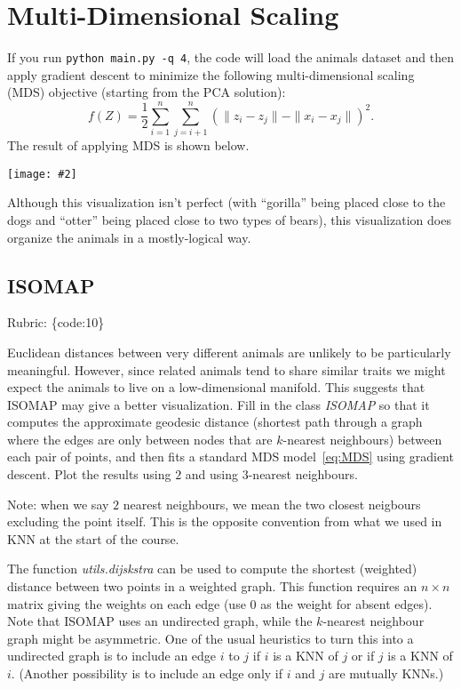 \documentclass{article}
\def\rubric#1{\gre{Rubric: \{#1\}}}{}
\def\blu#1{{\color{blu}#1}}
\def\gre#1{{\color{gre}#1}}
\def\norm#1{\|#1\|}
\newcommand{\centerfig}[2]{\begin{center}\texttt{[image: \#2]}\end{center}}
\begin{document}
\section{Multi-Dimensional Scaling}

If you run \verb|python main.py -q 4|, the code will load the animals dataset and then apply gradient descent to minimize the following multi-dimensional scaling (MDS) objective (starting from the PCA solution):
\begin{equation}
\label{eq:MDS}
f(Z) =  \frac{1}{2}\sum_{i=1}^n\sum_{j=i+1}^n (  \norm{z_i - z_j} - \norm{x_i - x_j})^2.
\end{equation}
 The result of applying MDS is shown below.
\centerfig{.5}{../figs/MDS_animals.png}
Although this visualization isn't perfect (with ``gorilla'' being placed close to the dogs and ``otter'' being placed close to two types of bears), this visualization does organize the animals in a mostly-logical way.


\subsection{ISOMAP}
\rubric{code:10}

Euclidean distances between very different animals are unlikely to be particularly meaningful.
However, since related animals tend to share similar traits we might expect the animals to live on a low-dimensional manifold.
This suggests that ISOMAP may give a better visualization.
Fill in the class \emph{ISOMAP} so that it computes the approximate geodesic distance
(shortest path through a graph where the edges are only between nodes that are $k$-nearest neighbours) between each pair of points,
and then fits a standard MDS model~\eqref{eq:MDS} using gradient descent. \blu{Plot the results using $2$ and using $3$-nearest neighbours}.

Note: when we say $2$ nearest neighbours, we mean the two closest neigbours excluding the point itself. This is the opposite convention from what we used in KNN at the start of the course.

The function \emph{utils.dijskstra} can be used to compute the shortest (weighted) distance between two points in a weighted graph.
This function requires an $n \times n$ matrix giving the weights on each edge (use $0$ as the weight for absent edges).
Note that ISOMAP uses an undirected graph, while the $k$-nearest neighbour graph might be asymmetric.
One of the usual heuristics to turn this into a undirected graph is to include an edge $i$ to $j$ if $i$ is a KNN of $j$ or if $j$ is a KNN of $i$.
(Another possibility is to include an edge only if $i$ and $j$ are mutually KNNs.)
\end{document}
